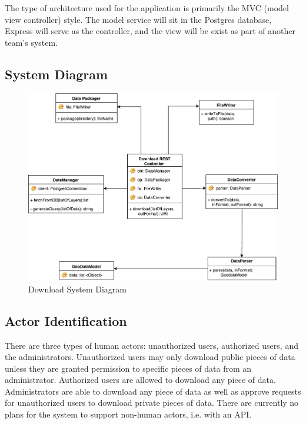 \documentclass{article}
\begin{document}
The type of architecture used for the application is primarily the MVC (model view controller) style. The model service will sit in the Postgres database, Express will serve as the controller, and the view will be exist as part of another team's system.

\subsection{System Diagram}

\begin{figure}[h!]
	\begin{center}
		\caption{Download System Diagram}
		\includegraphics[width=\textwidth]{images/system_diagram.pdf}
	\end{center}
\end{figure}

\subsection{Actor Identification}

There are three types of human actors: unauthorized users, authorized users, and the administrators. Unauthorized users may only download public pieces of data unless they are granted permission to specific pieces of data from an administrator. Authorized users are allowed to download any piece of data. Administrators are able to download any piece of data as well as approve requests for unauthorized users to download private pieces of data. There are currently no plans for the system to support non-human actors, i.e. with an API. 
\end{document}
